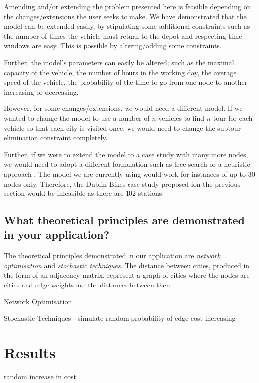 \documentclass[a4paper,11pt]{article}
\begin{document}
Amending and/or extending the problem presented here is feasible depending on the changes/extensions the user seeks to make. We have demonstrated that the model can be extended easily, by stipulating some additional constraints such as the number of times the vehicle must return to the depot and respecting time windows are easy. This is possible by altering/adding some constraints. 

Further, the model's parameters can easily be altered; such as the maximal capacity of the vehicle, the number of hours in the working day, the average speed of the vehicle, the probability of the time to go from one node to another increasing or decreasing.

However, for some changes/extensions, we would need a different model. If we wanted to change the model to use a number of $n$ vehicles to find $n$ tour for each vehicle so that each city is visited once, we would need to change the subtour elimination constraint completely. 

Further, if we were to extend the model to a case study with many more nodes, we would need to adopt a different formulation such as tree search or a heuristic approach \cite{gueret1999applications}. The model we are currently using would work for instances of up to 30 nodes only. Therefore, the Dublin Bikes case study proposed ion the previous section would be infeasible as there are 102 stations.



\subsection{What theoretical principles are demonstrated in your application?}

The theoretical principles demonstrated in our application are \textit{network optimisation} and \textit{stochastic techniques}. The distance between cities, produced in the form of an adjacency matrix, represent a graph of cities where the nodes are cities and edge weights are the distances between them.

Network Optimisation


Stochastic Techniques - simulate random probability of edge cost increasing

\section{Results}

random increase in cost
\end{document}
